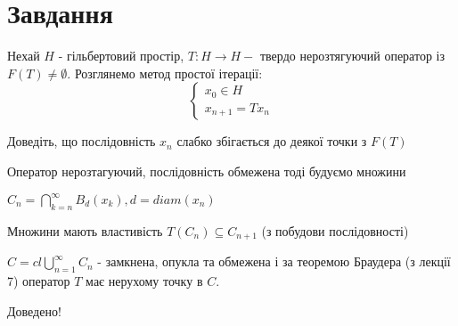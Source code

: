 
\chapter{Завдання \theHchapter}

\begin{tcolorbox}[title=Завдання]
    Нехай $H$ - гільбертовий простір, $T: H \rightarrow H-$ твердо нерозтягуючий
    оператор із $F(T) \neq \emptyset$. Розглянемо метод простої ітерації:
    $$
    \left\{\begin{array}{l}
    x_{0} \in H \\
    x_{n+1}=T x_{n}
    \end{array}\right.
    $$

    Доведіть, що послідовність $x_{n}$ слабко збігається 
    до деякої точки з $F(T)$
\end{tcolorbox}



Оператор нерозтагуючий, послідовність обмежена тоді будуємо множини


$C_n = \bigcap\limits_{k=n}^{\infty}B_d(x_k), d = diam(x_n)$


Множини мають властивість $T(C_n) \subseteq C_{n+1}$ (з побудови послідовності)


$C = cl\bigcup\limits_{n=1}^{\infty}C_n$ - замкнена, опукла та обмежена і за теоремою
Браудера (з лекції 7) оператор $T$ має нерухому точку в $C$.


Доведено!
